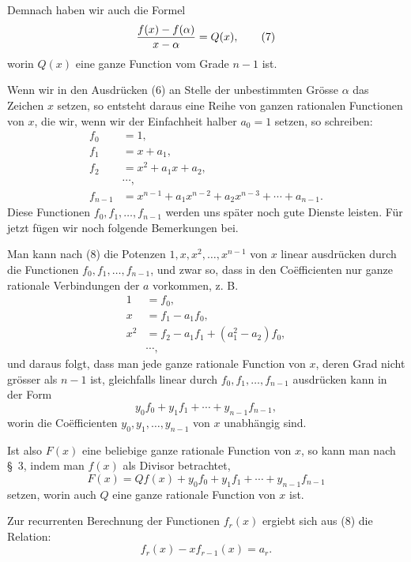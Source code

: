 
Demnach haben wir auch die Formel
\begin{equation}
 {f(x)-f(\alpha)\over x-\alpha}=Q(x),
\tag{7}
\end{equation}
worin $Q(x)$ eine ganze Function vom Grade $n-1$ ist.

Wenn wir in den Ausdrücken (6) an Stelle der unbestimmten Grösse
$\alpha$ das Zeichen $x$ setzen, so entsteht daraus eine Reihe von
ganzen rationalen Functionen von $x$, die wir, wenn wir der Einfachheit
halber $a_0=1$ setzen, so schreiben:
\begin{equation}
\begin{aligned}
 f_0&=1,\\
 f_1&=x+a_1,\\
 f_2&=x^2+a_1x+a_2,\\
 &\cdots,\\
 f_{n-1}&=x^{n-1}+a_1x^{n-2}+a_2x^{n-3}+\cdots+a_{n-1}.
\end{aligned}
\tag{8}
\end{equation}
Diese Functionen $f_0,f_1,\ldots,f_{n-1}$ werden uns später noch gute
Dienste leisten. Für jetzt fügen wir noch folgende Bemerkungen bei.

Man kann nach (8) die Potenzen $1,x,x^2,\ldots,x^{n-1}$ von $x$
linear ausdrücken durch die Functionen $f_0,f_1,\ldots,f_{n-1}$, und
zwar so, dass in den Coëfficienten nur ganze rationale Verbindungen der
$a$ vorkommen, z. B.
\[
\begin{aligned}
 1&=f_0,\\
 x&=f_1-a_1f_0,\\
 x^2&=f_2-a_1f_1+(a_1^2-a_2)f_0,\\
 &\cdots,
\end{aligned}
\]
und daraus folgt, dass man jede ganze rationale Function von $x$,
deren Grad nicht grösser als $n-1$ ist, gleichfalls linear durch
$f_0,f_1,\ldots,f_{n-1}$ ausdrücken kann in der Form
\begin{equation}
 y_0f_0+y_1f_1+\cdots+y_{n-1}f_{n-1},
\tag{9}
\end{equation}
worin die Coëfficienten $y_0,y_1,\ldots,y_{n-1}$ von $x$ unabhängig
sind.

Ist also $F(x)$ eine beliebige ganze rationale Function von $x$, so
kann man nach \S~3, indem man $f(x)$ als Divisor betrachtet,
\begin{equation}
 F(x)=Qf(x)+y_0f_0+y_1f_1+\cdots+y_{n-1}f_{n-1}
\tag{10}
\end{equation}
setzen, worin auch $Q$ eine ganze rationale Function von $x$ ist.

Zur recurrenten Berechnung der Functionen $f_r(x)$ ergiebt sich aus
(8) die Relation:
\begin{equation}
 f_r(x)-xf_{r-1}(x)=a_r.
\tag{11}
\end{equation}
